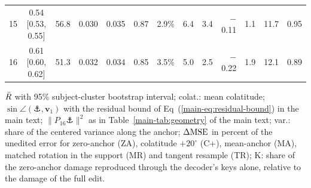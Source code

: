 \begin{table}[p]
\begin{tabular}{rcccccrrrrrrr}
15 & 0.54 [0.53, 0.55] & 56.8 & 0.030 & 0.035 & 0.87 & 2.9\% & 6.4 & 3.4 & $-$0.11 & 1.1 & 11.7 & 0.95 \\
16 & 0.61 [0.60, 0.62] & 51.3 & 0.032 & 0.034 & 0.85 & 3.5\% & 5.0 & 2.5 & $-$0.22 & 1.9 & 12.1 & 0.89 \\
\bottomrule
\end{tabular}
\begin{flushleft}\footnotesize $\bar{R}$ with 95\% subject-cluster bootstrap interval; colat.: mean colatitude; $\sin\angle(\anchor,\bm{v}_1)$ with the residual bound of Eq~(\ref{main-eq:residual-bound}) in the main text; $\|P_{16}\anchor\|^2$ as in Table~\ref{main-tab:geometry} of the main text; var.: share of the centered variance along the anchor; $\Delta\mathrm{MSE}$ in percent of the unedited error for zero-anchor (ZA), colatitude $+20^\circ$ (C+), mean-anchor (MA), matched rotation in the support (MR) and tangent resample (TR); K: share of the zero-anchor damage reproduced through the decoder's keys alone, relative to the damage of the full edit.\end{flushleft}
\end{table}

